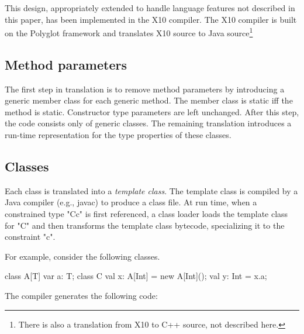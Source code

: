 \documentclass[preprint,nocopyrightspace,9pt]{sigplanconf}
\begin{document}
This design, appropriately extended to handle language features
not described in this paper, has been implemented in the X10
compiler.  The X10 compiler is built on the Polyglot framework
and translates X10 source to Java source\footnote{There is also
a translation from X10 to C++ source, not described here.}

\subsection{Method parameters}

The first step in translation is to remove method parameters by
introducing a generic member class for each generic method.
The member class is static iff the method is static.
Constructor type parameters are left unchanged.
After this step, the code consists only of generic classes.
The remaining translation introduces a run-time representation
for the type properties of these classes.

\subsection{Classes}

Each class is translated into a \emph{template class}.
The template class is compiled by a Java compiler (e.g., javac)
to produce a class file.
At run time, when a constrained type \xcd"C{c}" is first referenced, a
class loader loads the template class for \xcd"C" and then transforms the
template class bytecode, specializing it to the constraint
\xcd"c".

For example, consider the following classes.
\begin{xten}
class A[T] {
    var a: T;
}
class C {
    val x: A[Int] = new A[Int]();
    val y: Int = x.a;
}
\end{xten}

The compiler generates the following code:
\end{document}
